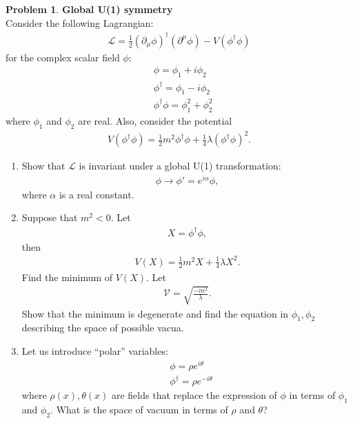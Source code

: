 \documentclass[a4paper,11pt]{article}
\numberwithin{equation}{section}
\theoremstyle{definition}
\newtheorem{prob}{Problem}[section]
\newcommand{\p}{\partial}
\newcommand{\lag}{\mathcal{L}}
\begin{document}
\begin{prob}\textbf{Global U(1) symmetry}\\
	
	Consider the following Lagrangian:
	\begin{align}
	\lag = \frac{1}{2}(\p_\mu\phi)^\dagger(\p^\mu \phi) - V(\phi^\dagger\phi)
	\end{align}
	for the complex scalar field $\phi$:
	\begin{align}
	&\phi = \phi_1 + i\phi_2\\
	&\phi^\dagger = \phi_1 - i\phi_2\\
	&\phi^\dagger\phi = \phi_1^2 + \phi_2^2
	\end{align}
	where $\phi_1$ and $\phi_2$ are real. Also, consider the potential
	\begin{align}
	V(\phi^\dagger\phi) = \frac{1}{2}m^2\phi^\dagger\phi + \frac{1}{4}\lambda(\phi^\dagger\phi)^2.
	\end{align}
	
	\begin{enumerate}
	\item Show that $\lag$ is invariant under a global U(1) transformation:
	\begin{align}
	\phi \to \phi' = e^{i\alpha}\phi,
	\end{align}
	where $\alpha$ is a real constant. \\
	
	\item Suppose that $m^2 < 0$. Let 
	\begin{align}
	X = \phi^\dagger\phi,
	\end{align}
	then
	\begin{align}
	V(X) = \frac{1}{2}m^2X + \frac{1}{4}\lambda X^2.
	\end{align} 
	Find the minimum of $V(X)$. Let 
	\begin{align}
	\mathcal{V} = \sqrt{\frac{-m^2}{\lambda}}. 
	\end{align}
	Show that the minimum is degenerate and find the equation in $\phi_1, \phi_2$ describing the space of possible vacua.\\
	
	\item Let us introduce ``polar'' variables:
	\begin{align}
	&\phi = \rho e^{i\theta}\\
	&\phi^\dagger = \rho e^{-i\theta}
	\end{align}
	where $\rho(x), \theta(x)$ are fields that replace the expression of $\phi$ in terms of $\phi_1$ and $\phi_2$. What is the space of vacuum in terms of $\rho$ and $\theta$?\\
		

\end{enumerate}
\end{prob}
\end{document}
